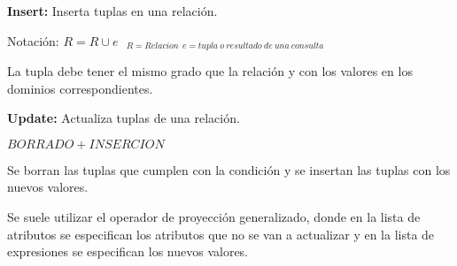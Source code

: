 \documentclass{article}
\begin{document}
\pagebreak

\textbf{Insert:} Inserta tuplas en una relación.

Notación: $R= R\cup e \ \ \ _{R=Relacion\ \ e=tupla\ o\ resultado\ de\ una\ consulta}$

La tupla debe tener el mismo grado que la relación y con los valores en los dominios correspondientes.

\textbf{Update:} Actualiza tuplas de una relación.

$BORRADO + INSERCION$

Se borran las tuplas que cumplen con la condición y se insertan las tuplas con los nuevos valores.

Se suele utilizar el operador de proyección generalizado, donde en la lista de atributos se especifican los atributos que no se van a actualizar y en la lista de expresiones se especifican los nuevos valores.
\end{document}
